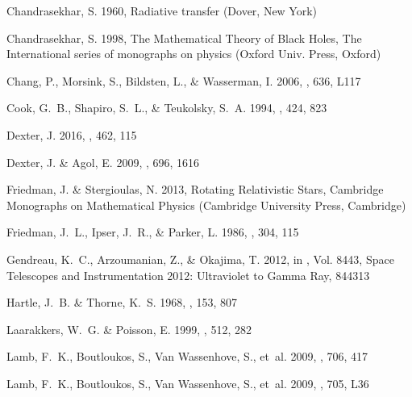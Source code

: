 \documentclass{aa}
\begin{document}
\begin{thebibliography}{63}
{Chandrasekhar}, S. 1960, {Radiative transfer} (Dover, New York)

Chandrasekhar, S. 1998, The Mathematical Theory of Black Holes, The International series of monographs on physics (Oxford Univ. Press, Oxford)

{Chang}, P., {Morsink}, S., {Bildsten}, L., \& {Wasserman}, I. 2006, \apjl,
  636, L117

{Cook}, G.~B., {Shapiro}, S.~L., \& {Teukolsky}, S.~A. 1994, \apj, 424, 823

{Dexter}, J. 2016, \mnras, 462, 115

{Dexter}, J. \& {Agol}, E. 2009, \apj, 696, 1616

Friedman, J. \& Stergioulas, N. 2013, Rotating Relativistic Stars, Cambridge
  Monographs on Mathematical Physics (Cambridge University Press, Cambridge)

{Friedman}, J.~L., {Ipser}, J.~R., \& {Parker}, L. 1986, \apj, 304, 115

{Gendreau}, K.~C., {Arzoumanian}, Z., \& {Okajima}, T. 2012, in \procspie, Vol.
  8443, Space Telescopes and Instrumentation 2012: Ultraviolet to Gamma Ray,
  844313

{Hartle}, J.~B. \& {Thorne}, K.~S. 1968, \apj, 153, 807

{Laarakkers}, W.~G. \& {Poisson}, E. 1999, \apj, 512, 282

{Lamb}, F.~K., {Boutloukos}, S., {Van Wassenhove}, S., {et~al.}
  2009{}, \apj, 706, 417

{Lamb}, F.~K., {Boutloukos}, S., {Van Wassenhove}, S., {et~al.}
  2009{}, \apjl, 705, L36


\end{thebibliography}
\end{document}
